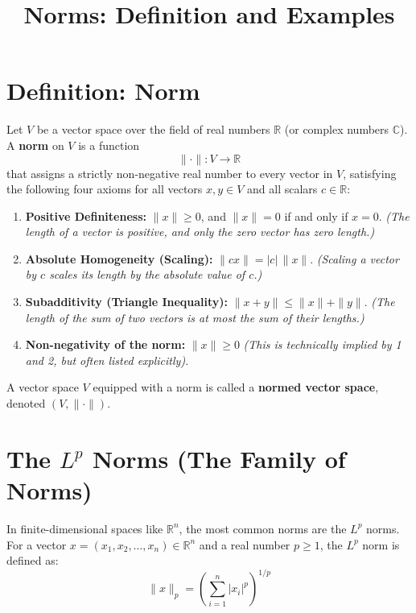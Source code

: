 \documentclass[11pt]{article}
\title{Norms: Definition and Examples}
\author{}
\date{}
\begin{document}
\maketitle

\section{Definition: Norm}

Let \(V\) be a vector space over the field of real numbers
\(\mathbb{R}\) (or complex numbers \(\mathbb{C}\)). A \textbf{norm} on
\(V\) is a function
\[
  \|\cdot\| : V \to \mathbb{R}
\]
that assigns a strictly non-negative real number to every vector in
\(V\), satisfying the following four axioms for all vectors
\(x, y \in V\) and all scalars \(c \in \mathbb{R}\):

\begin{enumerate}
  \item \textbf{Positive Definiteness:} \(\|x\| \ge 0\), and
        \(\|x\| = 0\) if and only if \(x = 0\).
        \emph{(The length of a vector is positive, and only the zero
        vector has zero length.)}
  \item \textbf{Absolute Homogeneity (Scaling):}
        \(\|c x\| = |c| \, \|x\|\).
        \emph{(Scaling a vector by \(c\) scales its length by the
        absolute value of \(c\).)}
  \item \textbf{Subadditivity (Triangle Inequality):}
        \(\|x + y\| \le \|x\| + \|y\|\).
        \emph{(The length of the sum of two vectors is at most the sum
        of their lengths.)}
  \item \textbf{Non-negativity of the norm:} \(\|x\| \ge 0\)
        \emph{(This is technically implied by 1 and 2, but often listed
        explicitly).}
\end{enumerate}

A vector space \(V\) equipped with a norm is called a \textbf{normed
vector space}, denoted \((V, \|\cdot\|)\).

\hrulefill

\section{The \(L^p\) Norms (The Family of Norms)}

In finite-dimensional spaces like \(\mathbb{R}^n\), the most common
norms are the \(L^p\) norms. For a vector
\(x = (x_1, x_2, \dots, x_n) \in \mathbb{R}^n\) and a real number
\(p \ge 1\), the \(L^p\) norm is defined as:
\[
  \|x\|_p = \left( \sum_{i=1}^n |x_i|^p \right)^{1/p}
\]
\end{document}
